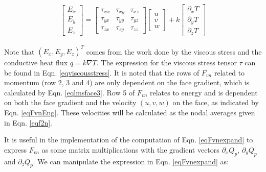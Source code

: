 \documentclass[12pt, letterpaper]{report}
\begin{document}
\begin{align}\label{eqFvnEng}
   \begin{bmatrix} E_x \\ E_y \\ E_z\end{bmatrix} = 
   \begin{bmatrix}
      \tau_{xx} & \tau_{xy} & \tau_{xz} \\
      \tau_{yx} & \tau_{yy} & \tau_{yz} \\
      \tau_{zx} & \tau_{zy} & \tau_{zz}
      \end{bmatrix} \begin{bmatrix}u \\ v \\ w\end{bmatrix} + k \begin{bmatrix} \partial_x T \\
   \partial_y T \\ \partial_z T\end{bmatrix}
\end{align}

Note that $(E_x, E_y, E_z)^T$ comes from the work done by the viscous stress and the conductive heat
flux $q = k\nabla T$. The expression for the viscous stress tensor $\tau$ can be found in Eqn.
\ref{eqviscousstress}. It is noted that the rows of $F_{vn}$ related to momentum (row 2, 3 and 4)
are only dependent on the face gradient, which is calculated by Eqn. \ref{eqlmsface3}. Row 5 of
$F_{vn}$ relates to energy and is dependent on both the face gradient and the velocity $(u, v, w)$
on the face, as indicated by Eqn. \ref{eqFvnEng}. These velocities will be calculated as the nodal
averages given in Eqn. \ref{eqf2n}. \paraspace

It is useful in the implementation of the computation of Eqn. \ref{eqFvnexpand} to express $F_{vn}$
as some matrix multiplications with the gradient vectors $\partial_x Q_p$, $\partial_y Q_p$ and
$\partial_z Q_p$. We can manipulate the expression in Eqn. \ref{eqFvnexpand} as:
\end{document}
